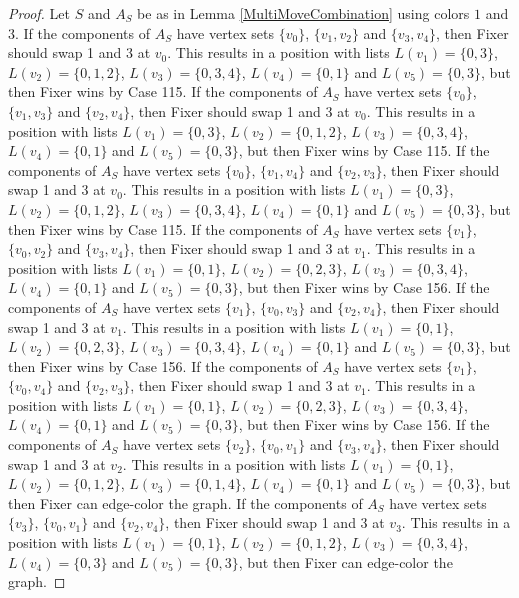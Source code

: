 \documentclass[12pt]{amsart}
\theoremstyle{plain}
\theoremstyle{definition}
\theoremstyle{remark}
\begin{document}
\begin{proof}
Let $S$ and $A_S$ be as in Lemma \ref{MultiMoveCombination} using colors $1$ and $3$. If the components of $A_S$ have vertex sets $\{v_0\}$, $\{v_1, v_2\}$ and $\{v_3, v_4\}$, then Fixer should swap 1 and 3 at $v_0$. This results in a position with lists $L(v_1) = \{0, 3\}$, $L(v_2) = \{0, 1, 2\}$, $L(v_3) = \{0, 3, 4\}$, $L(v_4) = \{0, 1\}$ and $L(v_5) = \{0, 3\}$, but then Fixer wins by Case 115.
If the components of $A_S$ have vertex sets $\{v_0\}$, $\{v_1, v_3\}$ and $\{v_2, v_4\}$, then Fixer should swap 1 and 3 at $v_0$. This results in a position with lists $L(v_1) = \{0, 3\}$, $L(v_2) = \{0, 1, 2\}$, $L(v_3) = \{0, 3, 4\}$, $L(v_4) = \{0, 1\}$ and $L(v_5) = \{0, 3\}$, but then Fixer wins by Case 115.
If the components of $A_S$ have vertex sets $\{v_0\}$, $\{v_1, v_4\}$ and $\{v_2, v_3\}$, then Fixer should swap 1 and 3 at $v_0$. This results in a position with lists $L(v_1) = \{0, 3\}$, $L(v_2) = \{0, 1, 2\}$, $L(v_3) = \{0, 3, 4\}$, $L(v_4) = \{0, 1\}$ and $L(v_5) = \{0, 3\}$, but then Fixer wins by Case 115.
If the components of $A_S$ have vertex sets $\{v_1\}$, $\{v_0, v_2\}$ and $\{v_3, v_4\}$, then Fixer should swap 1 and 3 at $v_1$. This results in a position with lists $L(v_1) = \{0, 1\}$, $L(v_2) = \{0, 2, 3\}$, $L(v_3) = \{0, 3, 4\}$, $L(v_4) = \{0, 1\}$ and $L(v_5) = \{0, 3\}$, but then Fixer wins by Case 156.
If the components of $A_S$ have vertex sets $\{v_1\}$, $\{v_0, v_3\}$ and $\{v_2, v_4\}$, then Fixer should swap 1 and 3 at $v_1$. This results in a position with lists $L(v_1) = \{0, 1\}$, $L(v_2) = \{0, 2, 3\}$, $L(v_3) = \{0, 3, 4\}$, $L(v_4) = \{0, 1\}$ and $L(v_5) = \{0, 3\}$, but then Fixer wins by Case 156.
If the components of $A_S$ have vertex sets $\{v_1\}$, $\{v_0, v_4\}$ and $\{v_2, v_3\}$, then Fixer should swap 1 and 3 at $v_1$. This results in a position with lists $L(v_1) = \{0, 1\}$, $L(v_2) = \{0, 2, 3\}$, $L(v_3) = \{0, 3, 4\}$, $L(v_4) = \{0, 1\}$ and $L(v_5) = \{0, 3\}$, but then Fixer wins by Case 156.
If the components of $A_S$ have vertex sets $\{v_2\}$, $\{v_0, v_1\}$ and $\{v_3, v_4\}$, then Fixer should swap 1 and 3 at $v_2$. This results in a position with lists $L(v_1) = \{0, 1\}$, $L(v_2) = \{0, 1, 2\}$, $L(v_3) = \{0, 1, 4\}$, $L(v_4) = \{0, 1\}$ and $L(v_5) = \{0, 3\}$, but then Fixer can edge-color the graph.
If the components of $A_S$ have vertex sets $\{v_3\}$, $\{v_0, v_1\}$ and $\{v_2, v_4\}$, then Fixer should swap 1 and 3 at $v_3$. This results in a position with lists $L(v_1) = \{0, 1\}$, $L(v_2) = \{0, 1, 2\}$, $L(v_3) = \{0, 3, 4\}$, $L(v_4) = \{0, 3\}$ and $L(v_5) = \{0, 3\}$, but then Fixer can edge-color the graph.

\end{proof}
\end{document}

